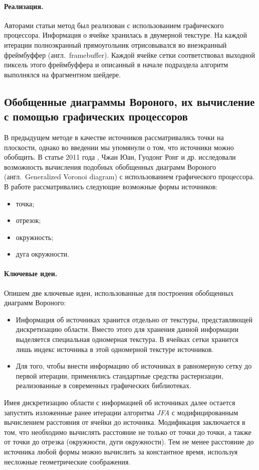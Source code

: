 \documentclass[12pt]{article}
\begin{document}
\paragraph{Реализация.} Авторами статьи метод был реализован с использованием 
графического процессора. Информация о ячейке хранилась в двумерной текстуре. 
На каждой итерации полноэкранный прямоугольник отрисовывался во внеэкранный
фреймбуффер (англ.~framebuffer). Каждой ячейке сетки соответствовал выходной
пиксель этого фреймбуффера и описанный в начале подраздела алгоритм
выполнялся на фрагментном шейдере.

\subsection{Обобщенные диаграммы Вороного, их вычисление с помощью графических 
процессоров}
\label{gvd}
В предыдущем методе в качестве источников рассматривались точки на плоскости, 
однако во введении мы упомянули о том, что источники можно обобщить. В статье 
2011 года \cite{gvd}, Чжан Юан, Гуодонг Ронг и др. исследовали возможность
вычисления подобных обобщенных диаграмм Вороного (англ.~Generalized Voronoi
diagram) с использованием графического  процессора. В работе рассматривались 
следующие возможные формы источников:

\begin{itemize}
\item точка;
\item отрезок;
\item окружность;
\item дуга окружности.
\end{itemize}

\paragraph{Ключевые идеи.} Опишем две ключевые идеи, использованные для
построения обобщенных диаграмм Вороного:
\begin{itemize}
\item Информация об источниках хранится отдельно от текстуры, представляющей
дискретизацию области. Вместо этого для хранения данной информации выделяется 
специальная одномерная текстура. В ячейках сетки хранится лишь индекс 
источника в этой одномерной текстуре источников.
\item Для того, чтобы внести информацию об источниках в равномерную сетку 
до первой итерации, применялись стандартные средства растеризации, реализованные 
в современных графических библиотеках.
\end{itemize}
Имея дискретизацию области с информацией об источниках далее остается
запустить изложенные ранее итерации алгоритма \emph{JFA} с модифицированным 
вычислением расстояния от ячейки до источника. Модификация заключается в том, что
необходимо вычислять расстояние не только от точки до точки, а также от точки до отрезка 
(окружности, дуги окружности). Тем не менее расстояние до источника любой формы 
можно вычислить за константное время, используя несложные геометрические соображения.
\end{document}
